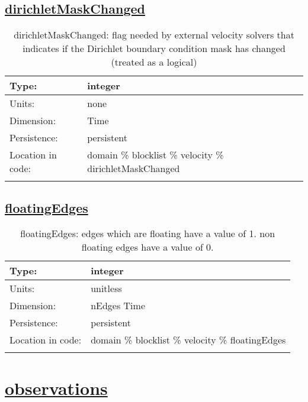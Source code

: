 \subsection[dirichletMaskChanged]{\hyperref[sec:var_tab_velocity]{dirichletMaskChanged}}
\label{subsec:var_sec_velocity_dirichletMaskChanged}
\begin{center}
\begin{longtable}{| p{2.0in} | p{4.0in} |}
        \hline 
        Type: & integer \\
        \hline 
        Units: & \si{none} \\
        \hline 
        Dimension: & Time \\
        \hline 
        Persistence: & persistent \\
        \hline 
         Location in code: & domain \% blocklist \% velocity \% dirichletMaskChanged \\
         \hline 
    \caption{dirichletMaskChanged: flag needed by external velocity solvers that indicates if the Dirichlet boundary condition mask has changed (treated as a logical)}
\end{longtable}
\end{center}
\subsection[floatingEdges]{\hyperref[sec:var_tab_velocity]{floatingEdges}}
\label{subsec:var_sec_velocity_floatingEdges}
\begin{center}
\begin{longtable}{| p{2.0in} | p{4.0in} |}
        \hline 
        Type: & integer \\
        \hline 
        Units: & \si{unitless} \\
        \hline 
        Dimension: & nEdges Time \\
        \hline 
        Persistence: & persistent \\
        \hline 
         Location in code: & domain \% blocklist \% velocity \% floatingEdges \\
         \hline 
    \caption{floatingEdges: edges which are floating have a value of 1.  non floating edges have a value of 0.}
\end{longtable}
\end{center}
\section[observations]{\hyperref[sec:var_tab_observations]{observations}}
\label{sec:var_sec_observations}
